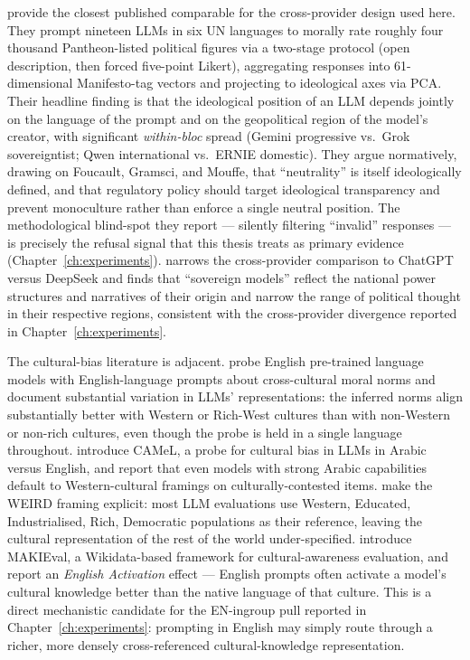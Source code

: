 \citet{buyl2024llm} provide the closest published comparable for the
cross-provider design used here. They prompt nineteen LLMs in six UN
languages to morally rate roughly four thousand Pantheon-listed political
figures via a two-stage protocol (open description, then forced
five-point Likert), aggregating responses into 61-dimensional
Manifesto-tag vectors and projecting to ideological axes via PCA. Their
headline finding is that the ideological position of an LLM depends
jointly on the language of the prompt and on the geopolitical region of
the model's creator, with significant \emph{within-bloc} spread (Gemini
progressive vs.\ Grok sovereigntist; Qwen international vs.\ ERNIE
domestic). They argue normatively, drawing on Foucault, Gramsci, and
Mouffe, that ``neutrality'' is itself ideologically defined, and that
regulatory policy should target ideological transparency and prevent
monoculture rather than enforce a single neutral position. The
methodological blind-spot they report --- silently filtering ``invalid''
responses --- is precisely the refusal signal that this thesis treats
as primary evidence (Chapter~\ref{ch:experiments}).
\citet{pacheco2025echoes} narrows the cross-provider comparison to
ChatGPT versus DeepSeek and finds that ``sovereign models'' reflect the
national power structures and narratives of their origin and narrow the
range of political thought in their respective regions, consistent with
the cross-provider divergence reported in
Chapter~\ref{ch:experiments}.

The cultural-bias literature is adjacent. \citet{ramezani2023moral}
probe English pre-trained language models with English-language
prompts about cross-cultural moral norms and document substantial
variation in LLMs' representations: the inferred norms align
substantially better with Western or Rich-West cultures than with
non-Western or non-rich cultures, even though the probe is held in
a single language throughout.
\citet{naous2024beer} introduce CAMeL, a probe for cultural bias in LLMs
in Arabic versus English, and report that even models with strong
Arabic capabilities default to Western-cultural framings on
culturally-contested items. \citet{atari2023humans} make the WEIRD
framing explicit: most LLM evaluations use Western, Educated,
Industrialised, Rich, Democratic populations as their reference,
leaving the cultural representation of the rest of the world
under-specified. \citet{zhao2025makieval} introduce MAKIEval, a
Wikidata-based framework for cultural-awareness evaluation, and report
an \emph{English Activation} effect --- English prompts often activate
a model's cultural knowledge better than the native language of that
culture. This is a direct mechanistic candidate for the EN-ingroup pull
reported in Chapter~\ref{ch:experiments}: prompting in English may
simply route through a richer, more densely cross-referenced
cultural-knowledge representation.

